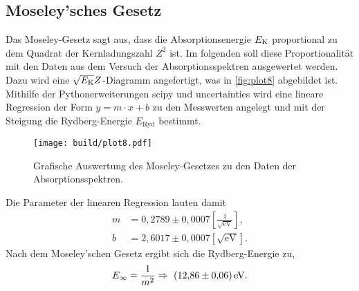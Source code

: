 \subsection{Moseley'sches Gesetz}
\label{subsec:moseley}

Das Moseley-Gesetz sagt aus, dass die Absorptionsenergie $E_{\text K}$ proportional zu dem Quadrat der Kernladungszahl $Z^2$ ist. Im folgenden soll diese
Proportionalität mit den Daten aus dem Versuch der Absorptionsspektren ausgewertet werden.
Dazu wird eine $\sqrt{E_{\text K}}Z$-Diagramm angefertigt, was in \autoref{fig:plot8} abgebildet ist. Mithilfe der Pythonerweiterungen scipy \cite{scipy} und uncertainties \cite{uncertainties} wird
eine lineare Regression der Form $y=m \cdot x +b$ zu den Messwerten angelegt und mit der Steigung die Rydberg-Energie $E_{\text{Ryd}}$ bestimmt.

\begin{figure}[H]
  \centering
  \texttt{[image: build/plot8.pdf]}
  \caption{Grafische Auswertung des Moseley-Gesetzes zu den Daten der Absorptionsspektren.}
  \label{fig:plot8}
\end{figure}

Die Parameter der linearen Regression lauten damit
\begin{align*}
  m &= 0,2789 \pm 0,0007 \left[\frac{1}{\sqrt{\text{eV}}}\right], \\
  b &= 2,6017 \pm 0,0007 \left[\sqrt{\text{eV}}\right].
\end{align*}
Nach dem Moseley'schen Gesetz ergibt sich die Rydberg-Energie zu,
\begin{align*}
  E_\infty = \frac{1}{m^2} \Rightarrow ~ \SI{12,86(0,06)}{\eV}.
\end{align*}